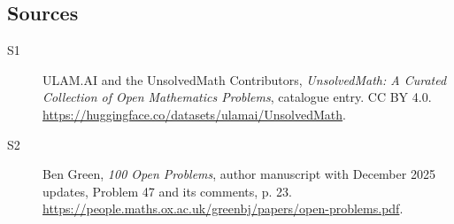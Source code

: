 \documentclass[11pt]{article}
\begin{document}
\subsection{Sources}
\begin{description}
\item[\hypertarget{source:statement:1}{S1}] ULAM.AI and the UnsolvedMath Contributors, \emph{UnsolvedMath: A Curated Collection of Open Mathematics Problems}, catalogue entry. CC BY 4.0. \url{https://huggingface.co/datasets/ulamai/UnsolvedMath}.
\item[\hypertarget{source:statement:2}{S2}] Ben Green, \emph{100 Open Problems}, author manuscript with December 2025 updates, Problem 47 and its comments, p. 23. \url{https://people.maths.ox.ac.uk/greenbj/papers/open-problems.pdf}.
\end{description}
\label{end:statement}
\end{document}
